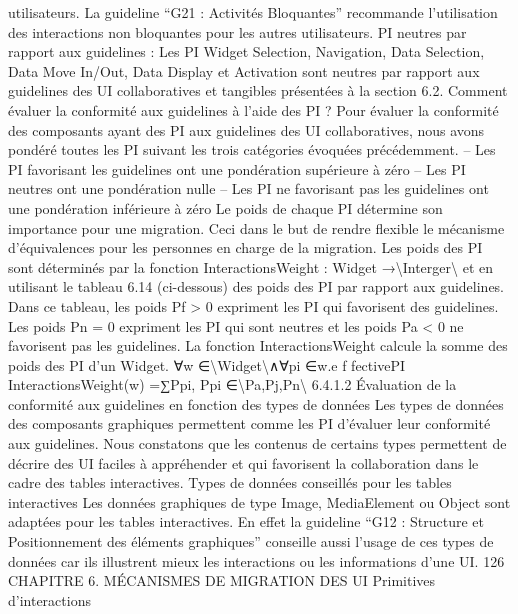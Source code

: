 \documentclass{article}
\begin{document}
utilisateurs. La guideline “G21 : Activit\'{e}s Bloquantes” recommande l’utilisation des interactions non
bloquantes pour les autres utilisateurs.
PI neutres par rapport aux guidelines :
Les PI Widget Selection, Navigation, Data Selection,
Data Move In/Out, Data Display et Activation sont neutres par rapport aux guidelines des UI collaboratives et tangibles pr\'{e}sent\'{e}es \`{a} la section 6.2.
Comment \'{e}valuer la conformit\'{e} aux guidelines \`{a} l’aide des PI ?
Pour \'{e}valuer la conformit\'{e} des
composants ayant des PI aux guidelines des UI collaboratives, nous avons pond\'{e}r\'{e} toutes les PI suivant
les trois cat\'{e}gories \'{e}voqu\'{e}es pr\'{e}c\'{e}demment.
– Les PI favorisant les guidelines ont une pond\'{e}ration sup\'{e}rieure \`{a} z\'{e}ro
– Les PI neutres ont une pond\'{e}ration nulle
– Les PI ne favorisant pas les guidelines ont une pond\'{e}ration inf\'{e}rieure \`{a} z\'{e}ro
Le poids de chaque PI d\'{e}termine son importance pour une migration. Ceci dans le but de rendre
ﬂexible le m\'{e}canisme d’\'{e}quivalences pour les personnes en charge de la migration. Les poids des PI
sont d\'{e}termin\'{e}s par la fonction
InteractionsWeight : Widget →\textbackslash{}{Interger\textbackslash{}}
et en utilisant le tableau 6.14 (ci-dessous) des poids des PI par rapport aux guidelines. Dans ce tableau,
les poids Pf > 0 expriment les PI qui favorisent des guidelines. Les poids Pn = 0 expriment les PI qui
sont neutres et les poids Pa < 0 ne favorisent pas les guidelines. La fonction InteractionsWeight
calcule la somme des poids des PI d’un Widget.
∀w ∈\textbackslash{}{Widget\textbackslash{}}∧∀pi ∈w.e f fectivePI
InteractionsWeight(w) =∑Ppi, Ppi ∈\textbackslash{}{Pa,Pj,Pn\textbackslash{}}
6.4.1.2
Évaluation de la conformit\'{e} aux guidelines en fonction des types de donn\'{e}es
Les types de donn\'{e}es des composants graphiques permettent comme les PI d’\'{e}valuer leur conformit\'{e} aux guidelines. Nous constatons que les contenus de certains types permettent de d\'{e}crire des UI
faciles \`{a} appr\'{e}hender et qui favorisent la collaboration dans le cadre des tables interactives.
Types de donn\'{e}es conseill\'{e}s pour les tables interactives
Les donn\'{e}es graphiques de type Image,
MediaElement ou Object sont adapt\'{e}es pour les tables interactives. En effet la guideline “G12 :
Structure et Positionnement des \'{e}l\'{e}ments graphiques” conseille aussi l’usage de ces types de donn\'{e}es
car ils illustrent mieux les interactions ou les informations d’une UI.
126
CHAPITRE 6. MÉCANISMES DE MIGRATION DES UI
Primitives
d’interactions
\end{document}
